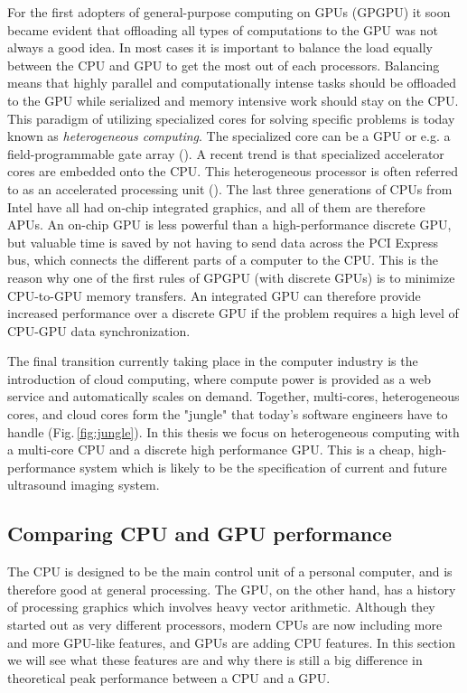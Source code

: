 For the first adopters of general-purpose computing on GPUs (GPGPU) it soon became evident that offloading all types of computations to the GPU was not always a good idea. In most cases it is important to balance the load equally between the CPU and GPU to get the most out of each processors. Balancing means that highly parallel and computationally intense tasks should be offloaded to the GPU while serialized and memory intensive work should stay on the CPU. This paradigm of utilizing specialized cores for solving specific problems is today known as \textit{heterogeneous computing}. The specialized core can be a GPU or e.g. a field-programmable gate array (). A recent trend is that specialized accelerator cores are embedded onto the CPU. This heterogeneous processor is often referred to as an accelerated processing unit (). The last three generations of CPUs from Intel have all had on-chip integrated graphics, and all of them are therefore APUs. An on-chip GPU is less powerful than a high-performance discrete GPU, but valuable time is saved by not having to send data across the PCI Express bus, which connects the different parts of a computer to the CPU. This is the reason why one of the first rules of GPGPU (with discrete GPUs) is to minimize CPU-to-GPU memory transfers. An integrated GPU can therefore provide increased performance over a discrete GPU if the problem requires a high level of CPU-GPU data synchronization.

The final transition currently taking place in the computer industry is the introduction of cloud computing, where compute power is provided as a web service and automatically scales on demand. Together, multi-cores, heterogeneous cores, and cloud cores form the "jungle" that today's software engineers have to handle (Fig.\,\ref{fig:jungle}). In this thesis we focus on heterogeneous computing with a multi-core CPU and a discrete high performance GPU. This is a cheap, high-performance system which is likely to be the specification of current and future ultrasound imaging system.

\subsection{Comparing CPU and GPU performance}\label{sec:cpu_vs_gpu}
The CPU is designed to be the main control unit of a personal computer, and is therefore good at general processing. The GPU, on the other hand, has a history of processing graphics which involves heavy vector arithmetic. Although they started out as very different processors, modern CPUs are now including more and more GPU-like features, and GPUs are adding CPU features. In this section we will see what these features are and why there is still a big difference in theoretical peak performance between a CPU and a GPU.

